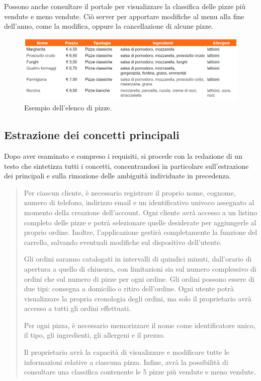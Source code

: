\documentclass[a4paper,12pt, oneside]{article}
\begin{document}
Possono anche consultare il portale per visualizzare la classifica delle
pizze più vendute e meno vendute. Ciò server per apportare modifiche
al menu alla fine dell'anno, come la modifica, oppure la cancellazione
di alcune pizze.

\newpage
\begin{figure}[h]
    \centering
    \includegraphics[width=1\textwidth]{esempio_pizze.png}
    \caption{Esempio dell'elenco di pizze.}
    \label{fig:esempio_pizze}
\end{figure}

\subsection{Estrazione dei concetti principali}

Dopo aver esaminato e compreso i requisiti, si procede con la redazione
di un testo che sintetizza tutti i concetti, concentrandosi in
particolare sull'estrazione dei principali e sulla rimozione delle
ambiguità individuate in precedenza.
\begin{quote}

Per ciascun cliente, è necessario registrare il proprio nome, cognome,
numero di telefono, indirizzo email e un identificativo univoco assegnato
al momento della creazione dell'account. Ogni cliente avrà accesso a un
listino completo delle pizze e potrà selezionare quelle desiderate per
aggiungerle al proprio ordine. Inoltre, l'applicazione gestirà
completamente la funzione del carrello, salvando eventuali modifiche
sul dispositivo dell'utente.

Gli ordini saranno catalogati in intervalli di quindici minuti,
dall'orario di apertura a quello di chiusura, con limitazioni sia
sul numero complessivo di ordini che sul numero di pizze per ogni
ordine. Gli ordini possono essere di due tipi: consegna a domicilio o
ritiro dell'ordine. Ogni utente potrà visualizzare la propria
cronologia degli ordini, ma solo il proprietario avrà accesso a tutti
gli ordini effettuati.

Per ogni pizza, è necessario memorizzare il nome come identificatore
unico, il tipo, gli ingredienti, gli allergeni e il prezzo.

Il proprietario avrà la capacità di visualizzare e modificare tutte
le informazioni relative a ciascuna pizza. Infine, avrà la possibilità
di consultare una classifica contenente le 5 pizze più vendute e meno
vendute.
\end{quote}
\end{document}
